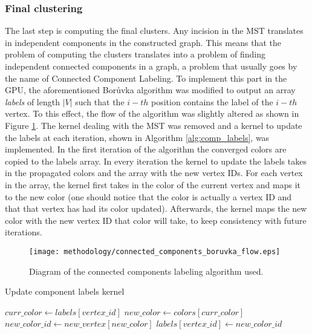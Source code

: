 \subsubsection{Final clustering}
The last step is computing the final clusters.
Any incision in the MST translates in independent components in the constructed graph.
This means that the problem of computing the clusters translates into a problem of finding independent connected components in a graph, a problem that usually goes by the name of Connected Component Labeling.
To implement this part in the GPU, the aforementioned Borůvka algorithm was modified to output an array \emph{labels} of length $|V|$ such that the $i-th$ position contains the label of the $i-th$ vertex.
To this effect, the flow of the algorithm was slightly altered as shown in Figure \ref{fig:connected comps flow}. 
The kernel dealing with the MST was removed and a kernel to update the labels at each iteration, shown in Algorithm \ref{alg:comp_labels}, was implemented.
In the first iteration of the algorithm the converged colors are copied to the labels array.
In every iteration the kernel to update the labels takes in the propagated colors and the array with the new vertex IDs.
For each vertex in the array, the kernel first takes in the color of the current vertex and maps it to the new color (one should notice that the color is actually a vertex ID and that that vertex has had its color updated).
Afterwards, the kernel maps the new color with the new vertex ID that color will take, to keep consistency with future iterations.

\begin{figure}[hbtp]
\centering
\texttt{[image: methodology/connected\_components\_boruvka\_flow.eps]}
\caption{Diagram of the connected components labeling algorithm used.}
\label{fig:connected comps flow}
\end{figure}


%
%


\begin{algorithm}
\caption{Update component labels kernel}\label{alg:comp_labels}
\begin{algorithmic}[1]
\State $curr\_color \gets labels[vertex\_id]$
\State $new\_color \gets colors[curr\_color]$
\State $new\_color\_id \gets new\_vertex[new\_color]$
\State $labels[vertex\_id] \gets new\_color\_id$
\EndProcedure
\end{algorithmic}
\end{algorithm}



